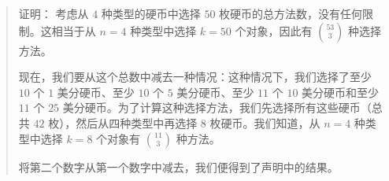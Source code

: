 \begin{enumerate}[label=(\arabic*)]
\begin{quotation}
              \begin{questions}{证明：}
                  考虑从 $4$ 种类型的硬币中选择 $50$ 枚硬币的总方法数，没有任何限制。这相当于从 $n = 4$ 种类型中选择 $k = 50$ 个对象，因此有 ${53 \choose 3}$ 种选择方法。

                  现在，我们要从这个总数中减去一种情况：这种情况下，我们选择了至少 $10$ 个 $1$ 美分硬币、至少 $10$ 个 $5$ 美分硬币、至少 $11$ 个 $10$ 美分硬币和至少 $11$ 个 $25$ 美分硬币。为了计算这种选择方法，我们先选择所有这些硬币（总共 $42$ 枚），然后从四种类型中再选择 $8$ 枚硬币。我们知道，从 $n = 4$ 种类型中选择 $k = 8$ 个对象有 ${11 \choose 3}$ 种方法。

                  将第二个数字从第一个数字中减去，我们便得到了声明中的结果。
              \end{questions}
          \end{quotation}
\end{enumerate}